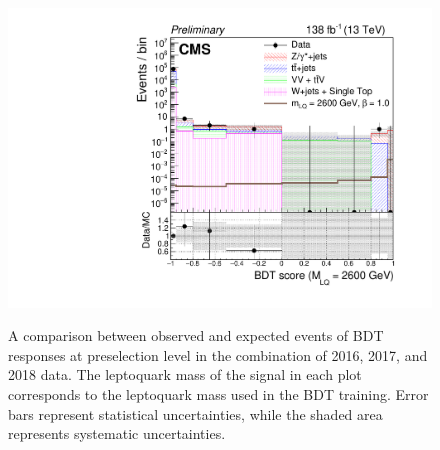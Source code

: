 \begin{figure}[H]
    {\includegraphics[width=.32\textwidth]{Images/Analysis/Results_combined_Unblinded/Plots/Preselection/BasicLQ_uujj_LQToBMu_pair_uubj_BDT_discrim_M2600_standard.pdf}}

    \caption{A comparison between observed and expected events of BDT responses at preselection level in the combination of 2016, 2017, and 2018 data. The leptoquark mass of the signal in each plot corresponds to the leptoquark mass used in the BDT training. Error bars represent statistical uncertainties, while the shaded area represents systematic uncertainties.
    \label{figapp:BDT1500to2600}}
\end{figure}

